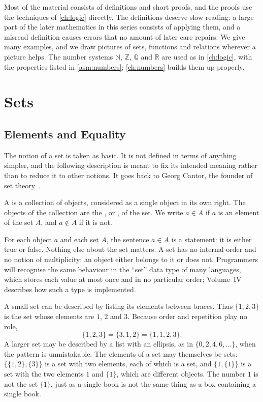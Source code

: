 Most of the material consists of definitions and short proofs, and the proofs use the techniques of \cref{ch:logic} directly. The definitions deserve slow reading: a large part of the later mathematics in this series consists of applying them, and a misread definition causes errors that no amount of later care repairs. We give many examples, and we draw pictures of sets, functions and relations wherever a picture helps. The number systems $\mathbb N$, $\mathbb Z$, $\mathbb Q$ and $\mathbb R$ are used as in \cref{ch:logic}, with the properties listed in \cref{asm:numbers}; \cref{ch:numbers} builds them up properly.

\section{Sets}
\label{sec:sets}

\subsection{Elements and Equality}

The notion of a set is taken as basic. It is not defined in terms of anything simpler, and the following description is meant to fix its intended meaning rather than to reduce it to other notions. It goes back to Georg Cantor, the founder of set theory~\cite{cantor1895}.

\begin{definition}
\label{def:set}
A  is a collection of objects, considered as a single object in its own right. The objects of the collection are the , or , of the set. We write $a\in A$ if $a$ is an element of the set $A$, and $a\notin A$ if it is not.
\end{definition}

For each object $a$ and each set $A$, the sentence $a\in A$ is a statement: it is either true or false. Nothing else about the set matters. A set has no internal order and no notion of multiplicity: an object either belongs to it or does not. Programmers will recognise the same behaviour in the ``set'' data type of many languages, which stores each value at most once and in no particular order; Volume~IV describes how such a type is implemented.

A small set can be described by listing its elements between braces. Thus $\{1,2,3\}$ is the set whose elements are $1$, $2$ and $3$. Because order and repetition play no role,
\[
\{1,2,3\}=\{3,1,2\}=\{1,1,2,3\}.
\]
A larger set may be described by a list with an ellipsis, as in $\{0,2,4,6,\ldots\}$, when the pattern is unmistakable. The elements of a set may themselves be sets: $\{\{1,2\},\{3\}\}$ is a set with two elements, each of which is a set, and $\{1,\{1\}\}$ is a set with the two elements $1$ and $\{1\}$, which are different objects. The number $1$ is not the set $\{1\}$, just as a single book is not the same thing as a box containing a single book.

